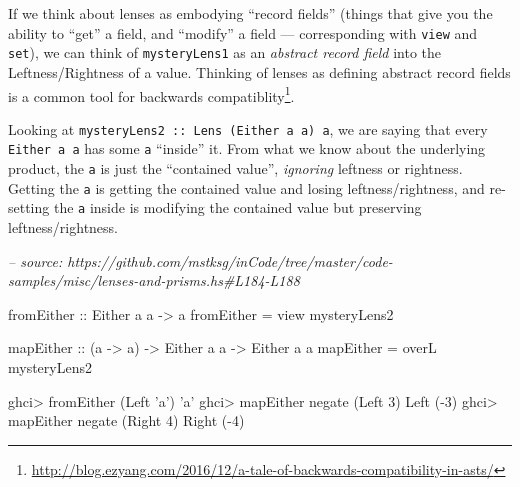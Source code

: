 \documentclass[]{article}
\newenvironment{Shaded}{}{}
\newcommand{\CharTok}[1]{\textcolor[rgb]{0.25,0.44,0.63}{#1}}
\newcommand{\CommentTok}[1]{\textcolor[rgb]{0.38,0.63,0.69}{\textit{#1}}}
\newcommand{\DataTypeTok}[1]{\textcolor[rgb]{0.56,0.13,0.00}{#1}}
\newcommand{\DecValTok}[1]{\textcolor[rgb]{0.25,0.63,0.44}{#1}}
\newcommand{\FunctionTok}[1]{\textcolor[rgb]{0.02,0.16,0.49}{#1}}
\newcommand{\NormalTok}[1]{#1}
\newcommand{\OtherTok}[1]{\textcolor[rgb]{0.00,0.44,0.13}{#1}}
\renewcommand{\href}[2]{#2\footnote{\url{#1}}}
\begin{document}
If we think about lenses as embodying ``record fields'' (things that give you
the ability to ``get'' a field, and ``modify'' a field --- corresponding with
\texttt{view} and \texttt{set}), we can think of \texttt{mysteryLens1} as an
\emph{abstract record field} into the Leftness/Rightness of a value. Thinking of
lenses as defining abstract record fields is a
\href{http://blog.ezyang.com/2016/12/a-tale-of-backwards-compatibility-in-asts/}{common
tool for backwards compatiblity}.

Looking at \texttt{mysteryLens2\ ::\ Lens\textquotesingle{}\ (Either\ a\ a)\ a},
we are saying that every \texttt{Either\ a\ a} has some \texttt{a} ``inside''
it. From what we know about the underlying product, the \texttt{a} is just the
``contained value'', \emph{ignoring} leftness or rightness. Getting the
\texttt{a} is getting the contained value and losing leftness/rightness, and
re-setting the \texttt{a} inside is modifying the contained value but preserving
leftness/rightness.

\begin{Shaded}
\begin{Highlighting}[]
\CommentTok{-- source: https://github.com/mstksg/inCode/tree/master/code-samples/misc/lenses-and-prisms.hs#L184-L188}

\OtherTok{fromEither ::} \DataTypeTok{Either}\NormalTok{ a a }\OtherTok{->}\NormalTok{ a}
\NormalTok{fromEither }\FunctionTok{=}\NormalTok{ view mysteryLens2}

\OtherTok{mapEither ::}\NormalTok{ (a }\OtherTok{->}\NormalTok{ a) }\OtherTok{->} \DataTypeTok{Either}\NormalTok{ a a }\OtherTok{->} \DataTypeTok{Either}\NormalTok{ a a}
\NormalTok{mapEither }\FunctionTok{=}\NormalTok{ overL mysteryLens2}
\end{Highlighting}
\end{Shaded}

\begin{Shaded}
\begin{Highlighting}[]
\NormalTok{ghci}\FunctionTok{>}\NormalTok{ fromEither (}\DataTypeTok{Left} \CharTok{'a'}\NormalTok{)}
\CharTok{'a'}
\NormalTok{ghci}\FunctionTok{>}\NormalTok{ mapEither negate (}\DataTypeTok{Left} \DecValTok{3}\NormalTok{)}
\DataTypeTok{Left}\NormalTok{ (}\FunctionTok{-}\DecValTok{3}\NormalTok{)}
\NormalTok{ghci}\FunctionTok{>}\NormalTok{ mapEither negate (}\DataTypeTok{Right} \DecValTok{4}\NormalTok{)}
\DataTypeTok{Right}\NormalTok{ (}\FunctionTok{-}\DecValTok{4}\NormalTok{)}
\end{Highlighting}
\end{Shaded}
\end{document}
